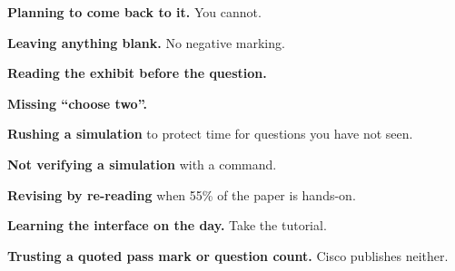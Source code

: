 \begin{pitfall}
\begin{tight}
  \item \textbf{Planning to come back to it.} You cannot.
  \item \textbf{Leaving anything blank.} No negative marking.
  \item \textbf{Reading the exhibit before the question.}
  \item \textbf{Missing ``choose two''.}
  \item \textbf{Rushing a simulation} to protect time for questions you have not
        seen.
  \item \textbf{Not verifying a simulation} with a  command.
  \item \textbf{Revising by re-reading} when 55\% of the paper is hands-on.
  \item \textbf{Learning the interface on the day.} Take the tutorial.
  \item \textbf{Trusting a quoted pass mark or question count.} Cisco publishes
        neither.
\end{tight}
\end{pitfall}

